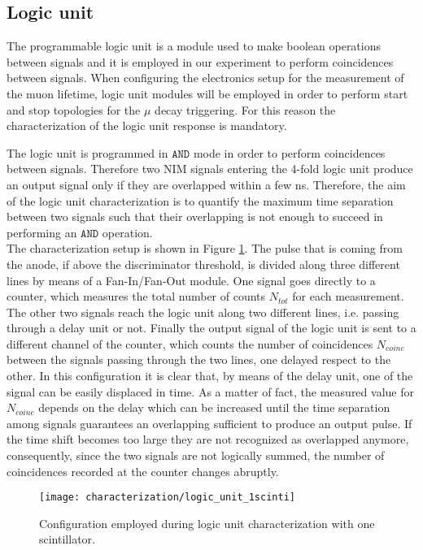 \subsection{Logic unit}
The programmable logic unit is a module used to make boolean operations between signals and it is employed in our experiment to perform coincidences between signals.
When configuring the electronics setup for the measurement of the muon lifetime, logic unit modules will be employed in order to perform start and stop topologies for the $\mu$ decay triggering. For this reason the characterization of the logic unit response is mandatory.

The logic unit is programmed in $\texttt{AND}$ mode in order to perform coincidences between signals. Therefore two NIM signals entering the 4-fold logic unit produce an output signal only if they are overlapped within a few ns.
Therefore, the aim of the logic unit characterization is to quantify the maximum time separation between two signals such that their overlapping is not enough to succeed in performing an $\texttt{AND}$ operation.\\

The characterization setup is shown in Figure \ref{logic_unit_1scinti}.
The pulse that is coming from the anode, if above the discriminator threshold, is divided along three different lines by means of a Fan-In/Fan-Out module.
One signal goes directly to a counter, which measures the total number of counts $N_{tot}$ for each measurement. 
The other two signals reach the logic unit along two different lines, i.e. passing through a delay unit or not. Finally the output signal of the logic unit is sent to a different channel of the counter, which counts the number of coincidences $N_{coinc}$ between the signals passing through the two lines, one delayed respect to the other.
In this configuration it is clear that, by means of the delay unit, one of the signal can be easily displaced in time. As a matter of fact, the measured value for $N_{coinc}$ depends on the delay which can be increased until the time separation among signals guarantees an overlapping sufficient to produce an output pulse. If the time shift becomes too large they are not recognized as overlapped anymore, consequently, since the two signals are not logically summed, the number of coincidences recorded at the counter changes abruptly.


\begin{figure}[!h]
	\centering
	\texttt{[image: characterization/logic\_unit\_1scinti]}
	\caption{Configuration employed during logic unit characterization with one scintillator.}
	\label{logic_unit_1scinti}
\end{figure}

